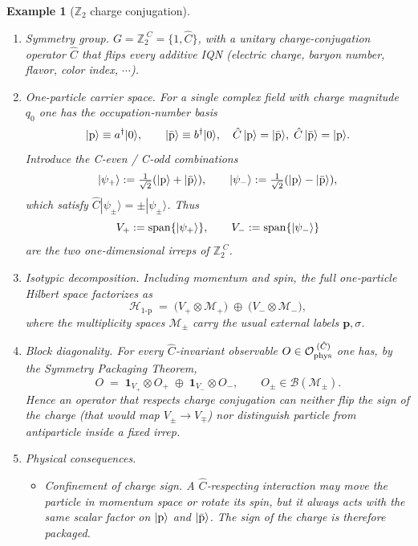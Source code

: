 \documentclass[12pt,a4paper]{article}
\newtheorem{example}{Example}
\begin{document}
\begin{example}[$\mathbb Z_{2}$ charge conjugation]
	\label{EX:Z2CPackaging}
	\leavevmode
	\begin{enumerate}
		\item Symmetry group.
		$G = \mathbb Z_{2}^{\;C}=\{1,\hat C\}$, with a unitary charge-conjugation
		operator $\hat C$ that flips every additive IQN
		(electric charge, baryon number, flavor, color index, $\cdots$).
		
		\item One-particle carrier space.
		For a single complex field with charge magnitude $q_{0}$ one has the
		occupation‑number basis
		\[
		|{\rm p}\rangle \equiv a^\dagger|0\rangle,
		\qquad
		|\bar{\rm p}\rangle \equiv b^\dagger|0\rangle,
		\quad
		\hat C\,|{\rm p}\rangle = |\bar{\rm p}\rangle,\;
		\hat C\,|\bar{\rm p}\rangle = |{\rm p}\rangle .
		\]
		Introduce the C‑even / C‑odd combinations
		\[
		|{\psi_+}\rangle
		:=\tfrac{1}{\sqrt2}(|{\rm p}\rangle+|\bar{\rm p}\rangle),\qquad
		|{\psi_-}\rangle
		:=\tfrac{1}{\sqrt2}(|{\rm p}\rangle-|\bar{\rm p}\rangle),
		\]
		which satisfy $\hat C|\psi_\pm\rangle=\pm|\psi_\pm\rangle$.
		Thus
		\[
		V_+ := {\rm span}\{|{\psi_+}\rangle\},
		\qquad
		V_- := {\rm span}\{|{\psi_-}\rangle\}
		\]
		are the two one‑dimensional irreps of $\mathbb Z_{2}^{\;C}$.
		
		\item Isotypic decomposition.
		Including momentum and spin, the full one‑particle Hilbert space factorizes as
		\[
		\mathcal H_{\text{1‑p}}
		\;=\;
		\bigl(V_+\otimes\mathcal M_+\bigr)
		\;\oplus\;
		\bigl(V_-\otimes\mathcal M_-\bigr),
		\]
		where the multiplicity spaces
		$\mathcal M_\pm$ carry the usual external labels $\mathbf p,\sigma$.
		
		\item Block diagonality.
		For every $\hat C$‑invariant observable
		$O\in\mathcal O_{\rm phys}^{\;(\hat C)}$ one has, by the
		Symmetry Packaging Theorem,
		\[
		O
		\;=\;
		\mathbf 1_{V_{+}}\otimes O_{+}
		\;\oplus\;
		\mathbf 1_{V_{-}}\otimes O_{-},
		\qquad
		O_{\pm}\in\mathcal B(\mathcal M_{\pm}).
		\]
		Hence an operator that respects charge conjugation can neither
		flip the sign of the charge (that would map $V_\pm\to V_\mp$) nor
		distinguish particle from antiparticle inside a fixed irrep.
		
		\item Physical consequences.
		\begin{itemize}
			\item Confinement of charge sign.
			A $\hat C$‑respecting interaction may move the particle in
			momentum space or rotate its spin, but it always acts with the same scalar factor on $|\rm p\rangle$ and $|\bar{\rm p}\rangle$.
			The sign of the charge is therefore packaged.
			

\end{itemize}
\end{enumerate}
\end{example}
\end{document}
